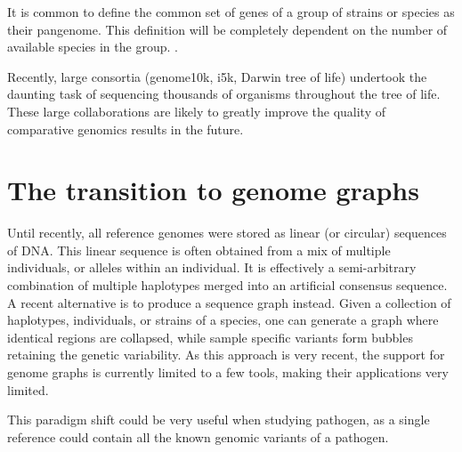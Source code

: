 It is common to define the common set of genes of a group of strains or species as their pangenome. This definition will be completely dependent on the number of available species in the group. .

Recently, large consortia (genome10k, i5k, Darwin tree of life) undertook the daunting task of sequencing thousands of organisms throughout the tree of life. These large collaborations are likely to greatly improve the quality of comparative genomics results in the future.

\section{The transition to genome graphs}

Until recently, all reference genomes were stored as linear (or circular) sequences of DNA. This linear sequence is often obtained from a mix of multiple individuals, or alleles within an individual. It is effectively a semi-arbitrary combination of multiple haplotypes merged into an artificial consensus sequence. A recent alternative is to produce a sequence graph instead. Given a collection of haplotypes, individuals, or strains of a species, one can generate a graph where identical regions are collapsed, while sample specific variants form bubbles retaining the genetic variability. As this approach is very recent, the support for genome graphs is currently limited to a few tools, making their applications very limited.

This paradigm shift could be very useful when studying pathogen, as a single reference could contain all the known genomic variants of a pathogen.